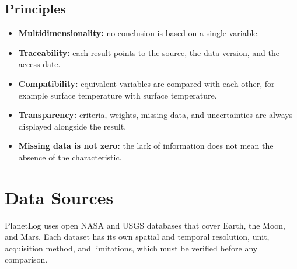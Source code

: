 \documentclass[12pt,letterpaper]{article}
\begin{document}
\subsection{Principles}

\begin{itemize}
  \item \textbf{Multidimensionality:} no conclusion is based on a single variable.
  \item \textbf{Traceability:} each result points to the source, the data version, and the access date.
  \item \textbf{Compatibility:} equivalent variables are compared with each other, for example surface temperature with surface temperature.
  \item \textbf{Transparency:} criteria, weights, missing data, and uncertainties are always displayed alongside the result.
  \item \textbf{Missing data is not zero:} the lack of information does not mean the absence of the characteristic.
\end{itemize}

\section{Data Sources}

PlanetLog uses open NASA and USGS databases that cover Earth, the Moon, and Mars. Each dataset has its own spatial and temporal resolution, unit, acquisition method, and limitations, which must be verified before any comparison.
\end{document}
